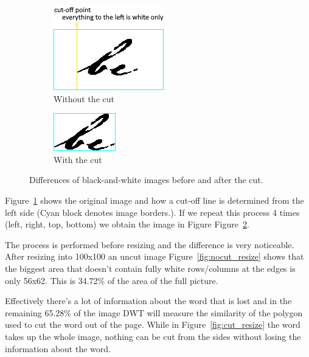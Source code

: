 \documentclass[12pt]{article}
\begin{document}
\begin{figure}
     \centering
     \begin{subfigure}[b]{0.3\textwidth}
         \centering
         \includegraphics[scale=1.0]{figs/grey_nocut.png}
         \caption{Without the cut}
         \label{fig:grey_nocut}
     \end{subfigure}
     \begin{subfigure}[b]{0.3\textwidth}
         \centering
         \includegraphics[scale=1.0]{figs/grey_cut.png}
         \caption{With the cut}
         \label{fig:grey_cut}
     \end{subfigure}
        \caption{Differences of black-and-white images before and after the cut.}
        \label{fig:orig_grey}
\end{figure}

Figure~\ref{fig:grey_nocut} shows the original image and how a cut-off line is determined from the left side (Cyan block denotes image borders.). If we repeat this process 4 times (left, right, top, bottom) we obtain the image in Figure Figure~\ref{fig:grey_cut}.

The process is performed before resizing and the difference is very noticeable. After resizing into 100x100 an uncut image Figure~\ref{fig:nocut_resize} shows that the biggest area that doesn't contain fully white rows/columns at the edges is only 56x62. This is 34.72\% of the area of the full picture.

Effectively there's a lot of information about the word that is lost and in the remaining 65.28\% of the image DWT will measure the similarity of the polygon used to cut the word out of the page. While in Figure~\ref{fig:cut_resize} the word takes up the whole image, nothing can be cut from the sides without losing the information about the word.
\end{document}
